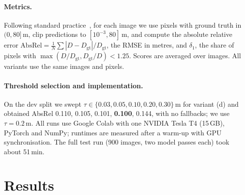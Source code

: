 \documentclass[10pt,twocolumn,letterpaper]{article}
\begin{document}
\paragraph{Metrics.}
Following standard practice~\cite{eigen2014depth}, for each image we use pixels with ground truth in
$(0, 80]$\,m, clip predictions to $[10^{-3}, 80]$\,m, and compute the absolute relative error
$\text{AbsRel} = \frac{1}{N}\sum |D-D_{\text{gt}}|/D_{\text{gt}}$, the RMSE in metres, and
$\delta_1$, the share of pixels with $\max(D/D_{\text{gt}}, D_{\text{gt}}/D) < 1.25$. Scores are
averaged over images. All variants use the same images and pixels.

\paragraph{Threshold selection and implementation.}
On the dev split we swept $\tau \in \{0.03, 0.05, 0.10, 0.20, 0.30\}$\,m for variant (d) and obtained
AbsRel 0.110, 0.105, 0.101, \textbf{0.100}, 0.144, with no fallbacks; we use $\tau = 0.2$\,m. All runs
use Google Colab with one NVIDIA Tesla T4 (15\,GB), PyTorch and NumPy; runtimes are measured after a
warm-up with GPU synchronisation. The full test run (900 images, two model passes each) took about
51\,min.

\section{Results}
\label{sec:results}
\end{document}
